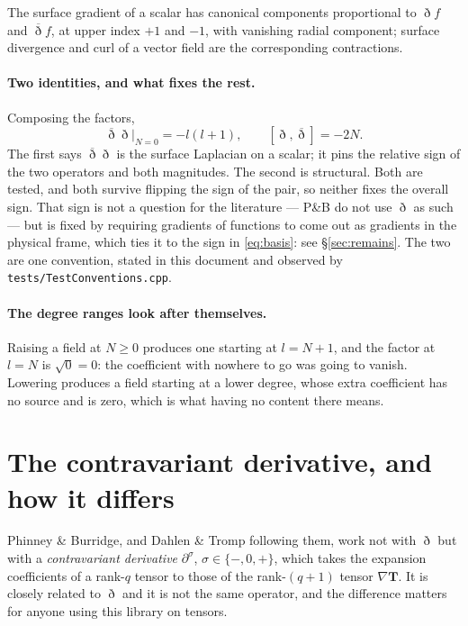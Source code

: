 \documentclass[11pt,a4paper]{article}
\newcommand{\conj}[1]{\overline{#1}}
\newcommand{\code}[1]{\texttt{#1}}
\begin{document}
The surface gradient of a scalar has canonical components proportional to
$\eth f$ and $\conj{\eth} f$, at upper index $+1$ and $-1$, with vanishing
radial component; surface divergence and curl of a vector field are the
corresponding contractions.

\paragraph{Two identities, and what fixes the rest.}  Composing the
factors,
\begin{equation}
  \conj{\eth}\eth\big|_{N=0} = -l(l+1),
  \qquad
  [\eth,\conj{\eth}] = -2N.
  \label{eq:ethidentities}
\end{equation}
The first says $\conj{\eth}\eth$ is the surface Laplacian on a scalar; it
pins the relative sign of the two operators and both magnitudes.  The
second is structural.  Both are tested, and both survive flipping the sign
of the pair, so neither fixes the overall sign.  That sign is not a
question for the literature --- P\&B do not use $\eth$ as such --- but is
fixed by requiring gradients of functions to come out as gradients in the
physical frame, which ties it to the sign in \eqref{eq:basis}: see
\S\ref{sec:remains}.  The two are one convention, stated in this document
and observed by \code{tests/TestConventions.cpp}.

\paragraph{The degree ranges look after themselves.}  Raising a field at
$N\geq 0$ produces one starting at $l=N+1$, and the factor at $l=N$ is
$\sqrt{0}=0$: the coefficient with nowhere to go was going to vanish.
Lowering produces a field starting at a lower degree, whose extra
coefficient has no source and is zero, which is what having no content
there means.

\section{The contravariant derivative, and how it differs}
\label{sec:contravariant}

Phinney \& Burridge, and Dahlen \& Tromp following them, work not with
$\eth$ but with a \emph{contravariant derivative} $\partial^\sigma$,
$\sigma\in\{-,0,+\}$, which takes the expansion coefficients of a rank-$q$
tensor to those of the rank-$(q+1)$ tensor $\nabla\mathbf{T}$.  It is
closely related to $\eth$ and it is not the same operator, and the
difference matters for anyone using this library on tensors.
\end{document}
